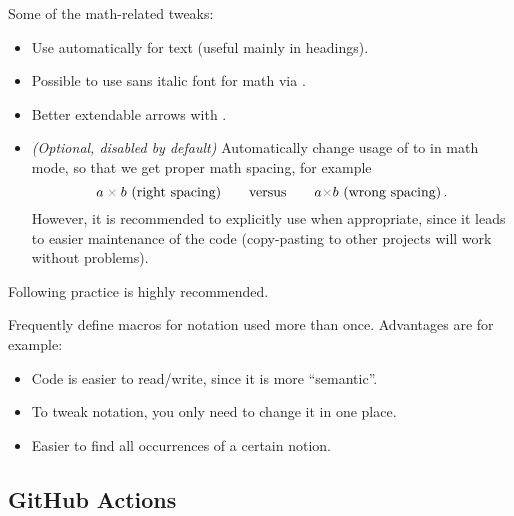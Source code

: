 Some of the math-related tweaks:
\begin{itemize}
    \item Use \macro{\boldmath} automatically for \macro{\textbf} text (useful mainly in headings).
    \item Possible to use sans italic font for math via \custommacro{\mathsfit}.
    \item Better extendable arrows with .
    \item \emph{(Optional, disabled by default)} Automatically change usage of \macro{\textcolor} to \macro{\mathcolor} in math mode, so that we get proper math spacing, for example
          \[ a \mathcolor{gray}{\times} b \text{ (right spacing)} \qquad\text{versus}\qquad a \textcolor{gray}{\times} b \text{ (wrong spacing)}\eqend \]
          However, it is recommended to explicitly use \macro{\mathcolor} when appropriate, since it leads to easier maintenance of the code (copy-pasting to other projects will work without problems).
\end{itemize}

\vspace{1ex}
Following practice is highly recommended.
\begin{tip}
    Frequently define macros for notation used more than once.
    Advantages are for example:
    \begin{itemize}
        \item Code is easier to read/write, since it is more \enquote{semantic}.
        \item To tweak notation, you only need to change it in one place.
        \item Easier to find all occurrences of a certain notion. \qedhere
    \end{itemize}
\end{tip}

\subsection{GitHub Actions}%
\label{sub:GitHub Actions}

